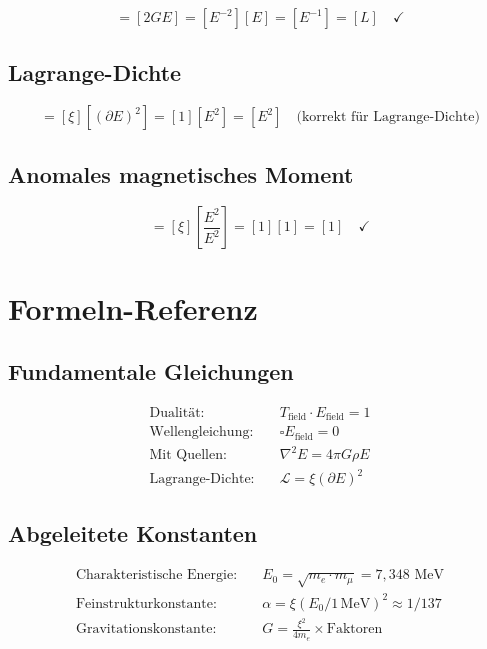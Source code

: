 	\begin{equation}
		[r_0] = [2GE] = [E^{-2}][E] = [E^{-1}] = [L] \quad \checkmark
	\end{equation}
	
	\subsection{Lagrange-Dichte}
	
	\begin{equation}
		[\mathcal{L}] = [\xi][(\partial E)^2] = [1][E^2] = [E^2] \quad \text{(korrekt für Lagrange-Dichte)}
	\end{equation}
	
	\subsection{Anomales magnetisches Moment}
	
	\begin{equation}
		[a_\ell] = [\xi]\left[\frac{E^2}{E^2}\right] = [1][1] = [1] \quad \checkmark
	\end{equation}
	
	\section{Formeln-Referenz}
	\label{sec:formula_reference}
	
	\subsection{Fundamentale Gleichungen}
	
	\begin{align}
		\text{Dualität:} \quad & T_{\text{field}} \cdot E_{\text{field}} = 1 \\
		\text{Wellengleichung:} \quad & \square E_{\text{field}} = 0 \\
		\text{Mit Quellen:} \quad & \nabla^2 E = 4\pi G \rho E \\
		\text{Lagrange-Dichte:} \quad & \mathcal{L} = \xi (\partial E)^2
	\end{align}
	
	\subsection{Abgeleitete Konstanten}
	
	\begin{align}
		\text{Charakteristische Energie:} \quad & E_0 = \sqrt{m_e \cdot m_\mu} = 7{,}348 \text{ MeV} \\
		\text{Feinstrukturkonstante:} \quad & \alpha = \xi (E_0/1\,\text{MeV})^2 \approx 1/137 \\
		\text{Gravitationskonstante:} \quad & G = \frac{\xi^2}{4m_e} \times \text{Faktoren}
	\end{align}
	
